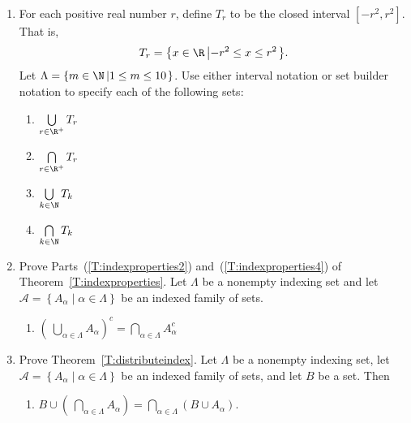 \begin{enumerate}
\item For each positive real number $r$, define $T_r$ to be the closed interval 
$\left[ -r^2, r^2 \right]$. That is, 
\label{exer:indexpositivereals}%
\[
T_r = \left\{ x \in \R \left| -r^2 \leq x \leq r^2 \right. \right\}\!.
\]
Let $\Lambda = \left\{ m \in \N \left| 1 \leq m \leq 10 \right. \right\}$.  Use either interval notation or set builder notation to specify each of the following sets:

\begin{multicols}{3}
\begin{enumerate}
\yitem $\bigcup\limits_{k \in \Lambda}^{}T_k$
\yitem $\bigcap\limits_{k \in \Lambda}^{}T_k$
\item $\bigcup\limits_{r \in \R^+}^{}T_r$
\item $\bigcap\limits_{r \in \R^+}^{}T_r$
\item $\bigcup\limits_{k \in \N}^{}T_k$
\item $\bigcap\limits_{k \in \N}^{}T_k$
\end{enumerate}
\end{multicols}

\item Prove Parts~(\ref{T:indexproperties2}) and~(\ref{T:indexproperties4}) of 
Theorem~\ref{T:indexproperties}.  Let $\Lambda$ be a nonempty indexing set and let 
$\mathscr{A} = \left\{ A_\alpha \mid \alpha \in \Lambda \right\}$ be an indexed family of sets. 
\label{exer:indexproperties}
\begin{enumerate}
\yitem For each $\beta \in \Lambda$, 
$A_\beta \subseteq \bigcup\limits_{\alpha \in \Lambda}^{}A_\alpha$.
\item $\left(\:\bigcup\limits_{\alpha \in \Lambda}^{}A_\alpha \right)^c = 
\bigcap\limits_{\alpha \in \Lambda}^{}A_{\alpha}^c$
\end{enumerate}

\item Prove Theorem~\ref{T:distributeindex}.  Let $\Lambda$ be a nonempty indexing set, let 
$\mathscr{A} = \left\{ A_\alpha \mid \alpha \in \Lambda \right\}$ be an indexed family of sets, and let $B$ be a set.  Then \label{exer:distributeindex}
\begin{enumerate}
\yitem $B \cap \left(\:\bigcup\limits_{\alpha \in \Lambda}^{}A_{\alpha} \right) 
= \bigcup\limits_{\alpha \in \Lambda}^{} \left( B \cap A_{\alpha} \right)$, and
\item $B \cup \left(\:\bigcap\limits_{\alpha \in \Lambda}^{}A_{\alpha} \right) 
= \bigcap\limits_{\alpha \in \Lambda}^{} \left( B \cup A_{\alpha} \right)$.
\end{enumerate}



\end{enumerate}
